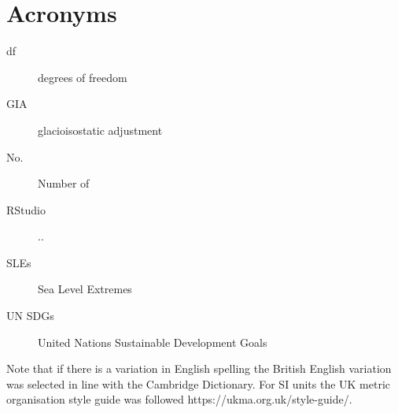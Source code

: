 
\chapter{Acronyms}
\begin{description}
\item[df]degrees of freedom
\item[GIA] glacioisostatic adjustment
\item[No.] Number of
\item [RStudio] ..
\item[SLEs] Sea Level Extremes
\item [UN SDGs] United Nations Sustainable Development Goals 
\end{description}

Note that if there is a variation in English spelling the British English variation was selected in line with the Cambridge Dictionary. For SI units the UK metric organisation style guide was followed https://ukma.org.uk/style-guide/.  